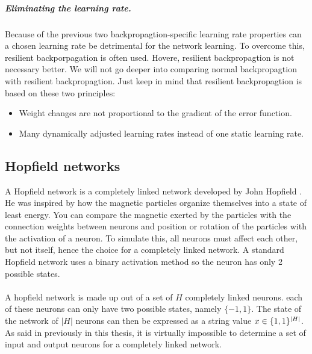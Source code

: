\documentclass[pdftex,a4paper,12pt,twoside]{report}
\theoremstyle{plain} \newtheorem{theorem}{Theorem} \newtheorem{proposition}{Proposition} \newtheorem{lemma}{Lemma} \newtheorem*{corollary}{Corollary}
\theoremstyle{definition} \newtheorem{definition}{Definition} \newtheorem{conjecture}{Conjecture} \newtheorem*{example}{Example} \newtheorem{algorithm}{Algorithm}
\theoremstyle{remark} \newtheorem*{remark}{Remark} \newtheorem*{note}{Note} \newtheorem{case}{Case}
\begin{document}
\subparagraph{Eliminating the learning rate.}
Because of the previous two backpropagtion-specific learning rate properties can a chosen learning rate be detrimental for the network learning. To overcome this, resilient backporpagation is often used. Hovere, resilient backpropagtion is not necessary better. We will not go deeper into comparing normal backpropagtion with resilient backpropagtion. Just keep in mind that resilient backpropagtion is based on these two principles:
\begin{itemize}
\item Weight changes are not proportional to the gradient of the error function.
\item Many dynamically adjusted learning rates instead of one static learning rate.
\end{itemize}
\subsection{Hopfield networks}
A Hopfield network is a completely linked network developed by John Hopfield \citep{Hopfield1982}. He was inspired by how the magnetic particles organize themselves into a state of least energy. You can compare the magnetic exerted by the particles with the connection weights between neurons and position or rotation of the particles with the activation of a neuron. To simulate this, all neurons must affect each other, but not itself, hence the choice for a completely linked network. A standard Hopfield network uses a binary activation method so the neuron has only 2 possible states.\\\\
A hopfield network is made up out of a set of $H$ completely linked neurons. each of these neurons can only have two possible states, namely $\{-1,1\}$. The state of the network of $|H|$ neurons can then be expressed as a string value $x \in \{\-1,1\}^{|H|}$. As said in previously in this thesis, it is virtually impossible to determine a set of input and output neurons for a completely linked network.
\end{document}
